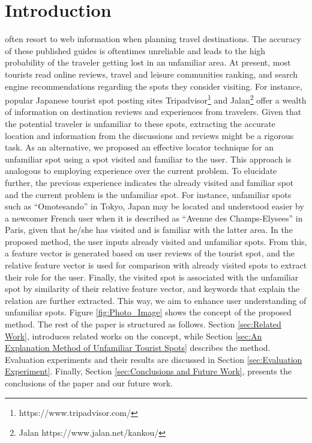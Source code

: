 \documentclass[journal]{IAENGtran}
\begin{document}
\section{Introduction}
\label{sec:Introduction}
 often resort to web information when planning travel destinations. The accuracy of these published guides is oftentimes unreliable and leads to the high probability of the traveler getting lost in an unfamiliar area. At present, most tourists read online reviews, travel and leisure communities ranking, and search engine recommendations regarding the spots they consider visiting. For instance, popular Japanese tourist spot posting sites Tripadvisor\footnote{https://www.tripadvisor.com/} and Jalan\footnote{Jalan https://www.jalan.net/kankou/} offer a wealth of information on destination reviews and experiences from travelers. Given that the potential traveler is unfamiliar to these spots, extracting the accurate location and information from the discussions and reviews might be a rigorous task. As an alternative, we proposed an effective locator technique for an unfamiliar spot using a spot visited and familiar to the user. This approach is analogous to employing experience over the current problem. To elucidate further, the previous experience indicates the already visited and familiar spot and the current problem is the unfamiliar spot. For instance, unfamiliar spots such as ``Omotesando'' in Tokyo, Japan may be located and understood easier by a newcomer French user when it is described as ``Avenue des Champs-Elysees'' in Paris, given that he/she has visited and is familiar with the latter area.
   In the proposed method, the user inputs already visited and unfamiliar spots. From this, a feature vector is generated based on user reviews of the tourist spot, and the relative feature vector is used for comparison with already visited spots to extract their role for the user. Finally, the visited spot is associated with the unfamiliar spot by similarity of their relative feature vector, and keywords that explain the relation are further extracted. This way, we aim to enhance user understanding of unfamiliar spots. Figure \ref{fig:Photo_Image} shows the concept of the proposed method.
   The rest of the paper is structured as follows. Section \ref{sec:Related Work}, introduces related works on the concept, while Section \ref{sec:An Explanation Method of Unfamiliar Tourist Spots} describes the method. Evaluation experiments and their results are discussed in Section \ref{sec:Evaluation Experiment}. Finally, Section \ref{sec:Conclusions and Future Work}, presents the conclusions of the paper and our future work.
\end{document}
